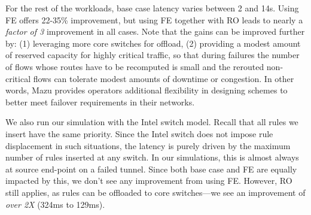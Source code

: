 For the rest of the workloads, base case latency varies between 2 and 14s. Using FE offers 22-35\% improvement, but using FE together with RO leads to nearly a {\em factor of 3} improvement in all cases. Note that the gains can be improved further by: (1) leveraging more core switches for offload, (2) providing a modest amount of reserved capacity for highly critical traffic, so that during failures the number of flows whose routes have to be recomputed is small and the rerouted non-critical flows can tolerate modest amounts of downtime or congestion. In other words, Mazu provides operators additional flexibility in designing schemes to better meet failover requirements in their networks.




We also run our simulation with the Intel switch model. Recall that all rules we insert have the same priority. Since the Intel switch does not 
impose rule displacement in such situations, the latency is purely driven by the maximum number of rules inserted at any switch. In our simulations, 
this is almost always at source end-point on a failed tunnel. Since both base case and FE are equally impacted by this, we don't see any improvement 
from using FE. However, RO still applies, as rules can be offloaded to core switches---we see an improvement of {\em over 2X} (324ms to 129ms).


